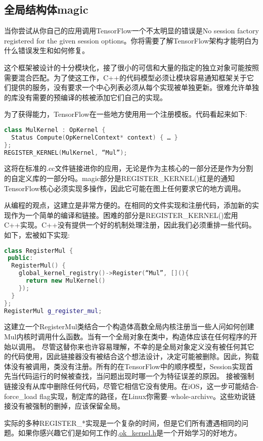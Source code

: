 \subsection{全局结构体magic}
当你尝试从你自己的应用调用TensorFlow一个不太明显的错误是No session factory registered for the given session options。你将需要了解TensorFlow架构才能明白为什么错误发生和如何修复。

这个框架被设计的十分模块化，接了很小的可信和大量的指定的独立对象可能按照需要混合匹配。为了使这工作，C++的代码模型必须让模块容易通知框架关于它们提供的服务，没有要求一个中心列表必须从每个实现被单独更新。很难允许单独的库没有需要的预编译的核被添加它们自己的实现。

为了获得能力，TensorFlow在一些地方使用用一个注册模板。代码看起来如下:
\begin{lstlisting}[language=C++]
class MulKernel : OpKernel {
  Status Compute(OpKernelContext* context) { … }
};
REGISTER_KERNEL(MulKernel, “Mul”);
\end{lstlisting}
这将在标准的.cc文件链接进你的应用，无论是作为主核心的一部分还是作为分割的自定义库的一部分吗。magic部分是REGISTER\_KERNEL()红是的通知TensorFlow核心必须实现多操作，因此它可能在图上任何要求它的地方调用。

从编程的观点，这建立是非常方便的。在相同的文件实现和注册代码，添加新的实现作为一个简单的编译和链接。困难的部分是REGISTER\_KERNEL()宏用C++实现。C++没有提供一个好的机制处理注册，因此我们必须重排一些代码。如下，宏被如下实现:
\begin{lstlisting}[language=C++]
class RegisterMul {
 public:
  RegisterMul() {
    global_kernel_registry()->Register(“Mul”, [](){
      return new MulKernel()
    });
  }
};
RegisterMul g_register_mul;
\end{lstlisting}
这建立一个RegisterMul类结合一个构造体高数全局内核注册当一些人问如何创建Mul内核时调用什么函数。当有一个全局对象在类中，构造体应该在任何程序的开始以调用。
尽管这替你来也许容易理解，不幸的是全局对象定义没有被任何其它的代码使用，因此链接器没有被结合这个想法设计，决定可能被删除。因此，狗载体没有被调用，类没有注册。所有的在TensorFlow中的顺序模型，Session实现首先当代码运行的时候被查找，当问题出现时哪一个为特征误差的原因。
接被强制链接没有从库中删除任何代码，尽管它相信它没有使用。在iOS，这一步可能结合-force\_load flag实现，制定库的路径，在Linux你需要--whole-archive。这些劝说链接没有被强制的删掉，应该保留全局。

实际的多种REGISTER\_*实现是一个复杂的时间，但是它们所有遭遇相同的问题。如果你感兴趣它们是如何工作的,\href{https://github.com/tensorflow/tensorflow/blob/master/tensorflow/core/framework/op_kernel.h#L1091}{ok\_kernel.h}是一个开始学习的好地方。
